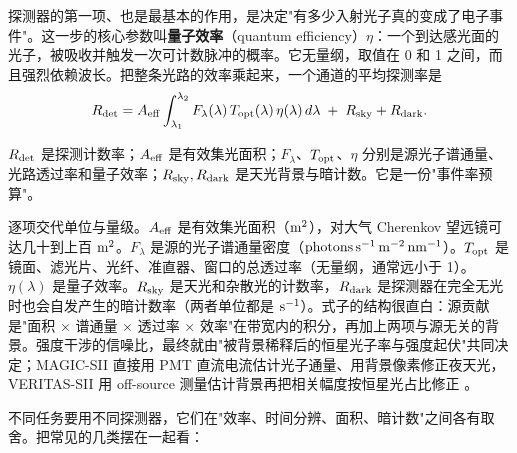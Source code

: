 探测器的第一项、也是最基本的作用，是决定"有多少入射光子真的变成了电子事件"。这一步的核心参数叫\textbf{量子效率}（quantum efficiency）\(\eta\)：一个到达感光面的光子，被吸收并触发一次可计数脉冲的概率。它无量纲，取值在 0 和 1 之间，而且强烈依赖波长。把整条光路的效率乘起来，一个通道的平均探测率是
\begin{equation}
  R_{\rm det}
  =
  A_{\rm eff}
  \int_{\lambda_1}^{\lambda_2}
  F_\lambda(\lambda)\,
  T_{\rm opt}(\lambda)\,
  \eta(\lambda)\,
  d\lambda
  \;+\;R_{\rm sky}+R_{\rm dark}.
  \label{eq:e13-detected-rate}
\end{equation}
\begin{formulaexplain}
\(R_{\rm det}\) 是探测计数率；\(A_{\rm eff}\) 是有效集光面积；\(F_\lambda\)、\(T_{\rm opt}\)、\(\eta\) 分别是源光子谱通量、光路透过率和量子效率；\(R_{\rm sky},R_{\rm dark}\) 是天光背景与暗计数。它是一份"事件率预算"。
\end{formulaexplain}
逐项交代单位与量级。\(A_{\rm eff}\) 是有效集光面积（\({\rm m}^2\)），对大气 Cherenkov 望远镜可达几十到上百 \({\rm m}^2\)。\(F_\lambda\) 是源的光子谱通量密度（\({\rm photons\,s^{-1}\,m^{-2}\,nm^{-1}}\)）。\(T_{\rm opt}\) 是镜面、滤光片、光纤、准直器、窗口的总透过率（无量纲，通常远小于 1）。\(\eta(\lambda)\) 是量子效率。\(R_{\rm sky}\) 是天光和杂散光的计数率，\(R_{\rm dark}\) 是探测器在完全无光时也会自发产生的暗计数率（两者单位都是 \({\rm s}^{-1}\)）。式子的结构很直白：源贡献是"面积 × 谱通量 × 透过率 × 效率"在带宽内的积分，再加上两项与源无关的背景。强度干涉的信噪比，最终就由"被背景稀释后的恒星光子率与强度起伏"共同决定；MAGIC-SII 直接用 PMT 直流电流估计光子通量、用背景像素修正夜天光，VERITAS-SII 用 off-source 测量估计背景再把相关幅度按恒星光占比修正 \citep{2020NatAs...4.1164A,2024MNRAS.529.4387A}。

不同任务要用不同探测器，它们在"效率、时间分辨、面积、暗计数"之间各有取舍。把常见的几类摆在一起看：

